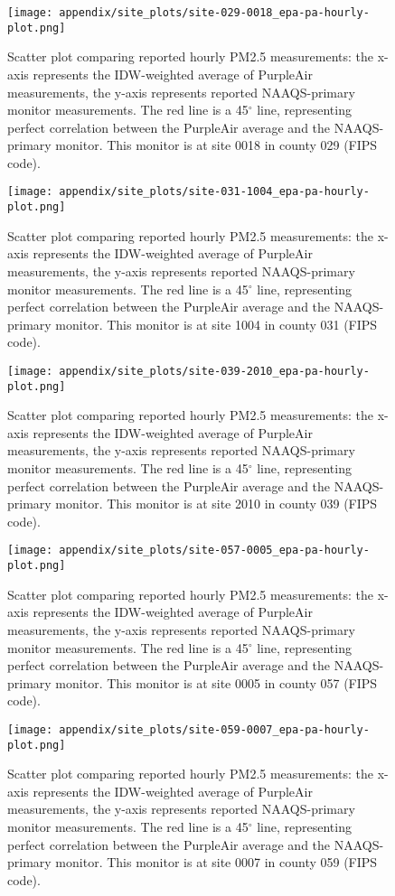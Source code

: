 \begin{figure}
\centering
\texttt{[image: appendix/site\_plots/site-029-0018\_epa-pa-hourly-plot.png]}
\caption{Scatter plot comparing reported hourly PM2.5 measurements: the x-axis represents the IDW-weighted average of PurpleAir measurements, the y-axis represents reported NAAQS-primary monitor measurements. The red line is a 45$^\circ$ line, representing perfect correlation between the PurpleAir average and the NAAQS-primary monitor. This monitor is at site 0018 in county 029 (FIPS code).}
\label{fig:pa-epa-compare_029-0018}
\end{figure}
\begin{figure}
\centering
\texttt{[image: appendix/site\_plots/site-031-1004\_epa-pa-hourly-plot.png]}
\caption{Scatter plot comparing reported hourly PM2.5 measurements: the x-axis represents the IDW-weighted average of PurpleAir measurements, the y-axis represents reported NAAQS-primary monitor measurements. The red line is a 45$^\circ$ line, representing perfect correlation between the PurpleAir average and the NAAQS-primary monitor. This monitor is at site 1004 in county 031 (FIPS code).}
\label{fig:pa-epa-compare_031-1004}
\end{figure}
\begin{figure}
\centering
\texttt{[image: appendix/site\_plots/site-039-2010\_epa-pa-hourly-plot.png]}
\caption{Scatter plot comparing reported hourly PM2.5 measurements: the x-axis represents the IDW-weighted average of PurpleAir measurements, the y-axis represents reported NAAQS-primary monitor measurements. The red line is a 45$^\circ$ line, representing perfect correlation between the PurpleAir average and the NAAQS-primary monitor. This monitor is at site 2010 in county 039 (FIPS code).}
\label{fig:pa-epa-compare_039-2010}
\end{figure}
\begin{figure}
\centering
\texttt{[image: appendix/site\_plots/site-057-0005\_epa-pa-hourly-plot.png]}
\caption{Scatter plot comparing reported hourly PM2.5 measurements: the x-axis represents the IDW-weighted average of PurpleAir measurements, the y-axis represents reported NAAQS-primary monitor measurements. The red line is a 45$^\circ$ line, representing perfect correlation between the PurpleAir average and the NAAQS-primary monitor. This monitor is at site 0005 in county 057 (FIPS code).}
\label{fig:pa-epa-compare_057-0005}
\end{figure}
\begin{figure}
\centering
\texttt{[image: appendix/site\_plots/site-059-0007\_epa-pa-hourly-plot.png]}
\caption{Scatter plot comparing reported hourly PM2.5 measurements: the x-axis represents the IDW-weighted average of PurpleAir measurements, the y-axis represents reported NAAQS-primary monitor measurements. The red line is a 45$^\circ$ line, representing perfect correlation between the PurpleAir average and the NAAQS-primary monitor. This monitor is at site 0007 in county 059 (FIPS code).}
\label{fig:pa-epa-compare_059-0007}
\end{figure}
